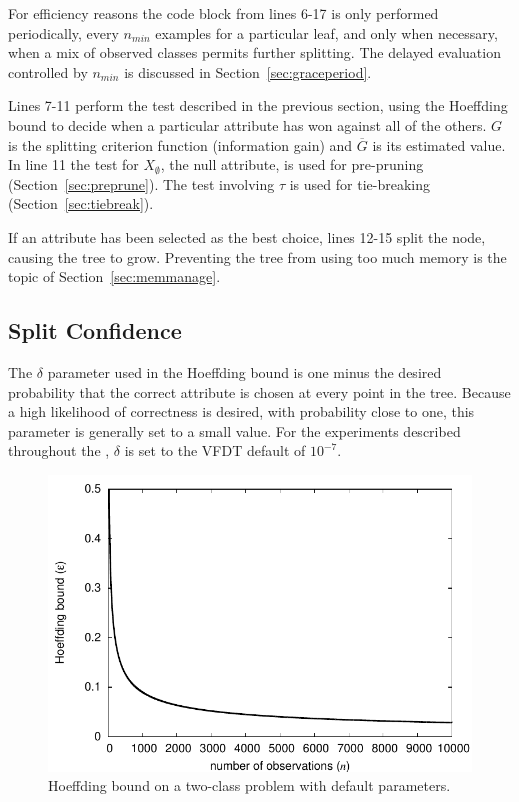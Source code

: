 For efficiency reasons the code block from lines 6-17 is only performed periodically, every $n_{min}$ examples for a particular leaf, and only when necessary, when a mix of observed classes permits further splitting. The delayed evaluation controlled by $n_{min}$ is discussed in Section~\ref{sec:graceperiod}.

Lines 7-11 perform the test described in the previous section, using the Hoeffding bound to decide when a particular attribute has won against all of the others. $G$ is the splitting criterion function (information gain) and $\overline{G}$ is its estimated value. In line 11 the test for $X_{\emptyset}$, the null attribute, is used for pre-pruning (Section~\ref{sec:preprune}). The test involving $\tau$ is used for tie-breaking (Section~\ref{sec:tiebreak}).

If an attribute has been selected as the best choice, lines 12-15 split the node, causing the tree to grow. Preventing the tree from using too much memory is the topic of Section~\ref{sec:memmanage}.

\subsection{Split Confidence}
\label{sec:splitconf}

The $\delta$ parameter used in the Hoeffding bound is one minus the desired probability that the correct attribute is chosen at every point in the tree. Because a high likelihood of correctness is desired, with probability close to one, this parameter is generally set to a small value. For the experiments described throughout the \thesisc,  $\delta$ is set to the VFDT default of $10^{-7}$.

\begin{figure}
\includegraphics{figures/hoeffdingbound2class}
\caption{Hoeffding bound on a two-class problem with default parameters.}
\label{fig:hbound}
\end{figure}

